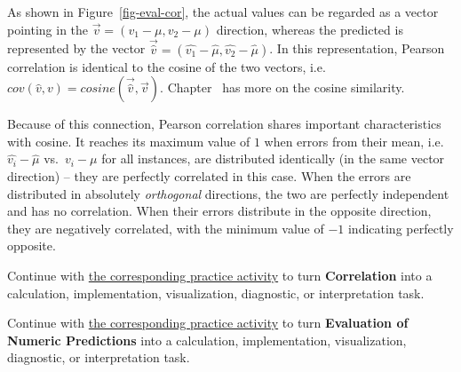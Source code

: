 \documentclass[
  letterpaper,
]{scrbook}
\begin{document}
As shown in Figure~\ref{fig-eval-cor}, the actual values can be regarded
as a vector pointing in the \(\vec{v} = (v_1-\mu, v_2-\mu)\) direction,
whereas the predicted is represented by the vector
\(\vec{\hat{v}}=(\hat{v_1}-\hat{\mu}, \hat{v_2}-\hat{\mu})\). In this
representation, Pearson correlation is identical to the cosine of the
two vectors, i.e.~\(cov(\hat{v}, v) = cosine(\vec{\hat{v}},\vec{v})\).
Chapter~ has more on the cosine similarity.

Because of this connection, Pearson correlation shares important
characteristics with cosine. It reaches its maximum value of \(1\) when
errors from their mean, i.e.~\(\hat{v_i} - \hat{\mu}\) vs.~\(v_i - \mu\)
for all instances, are distributed identically (in the same vector
direction) -- they are perfectly correlated in this case. When the
errors are distributed in absolutely \emph{orthogonal} directions, the
two are perfectly independent and has no correlation. When their errors
distribute in the opposite direction, they are negatively correlated,
with the minimum value of \(-1\) indicating perfectly opposite.

\begin{tcolorbox}[enhanced jigsaw, arc=.35mm, bottomrule=.15mm, bottomtitle=1mm, breakable, colback=white, colbacktitle=quarto-callout-tip-color!10!white, colframe=quarto-callout-tip-color-frame, coltitle=black, left=2mm, leftrule=.75mm, opacityback=0, opacitybacktitle=0.6, rightrule=.15mm, title=\textcolor{quarto-callout-tip-color}{\faLightbulb}\hspace{0.5em}{Put it into practice}, titlerule=0mm, toprule=.15mm, toptitle=1mm]

Continue with \hyperref[sec-pr-14-correlation]{the corresponding
practice activity} to turn \textbf{Correlation} into a calculation,
implementation, visualization, diagnostic, or interpretation task.

\end{tcolorbox}

\begin{tcolorbox}[enhanced jigsaw, arc=.35mm, bottomrule=.15mm, bottomtitle=1mm, breakable, colback=white, colbacktitle=quarto-callout-tip-color!10!white, colframe=quarto-callout-tip-color-frame, coltitle=black, left=2mm, leftrule=.75mm, opacityback=0, opacitybacktitle=0.6, rightrule=.15mm, title=\textcolor{quarto-callout-tip-color}{\faLightbulb}\hspace{0.5em}{Put it into practice}, titlerule=0mm, toprule=.15mm, toptitle=1mm]

Continue with \hyperref[sec-pr-14-evaluation-of-numeric-predictions]{the
corresponding practice activity} to turn \textbf{Evaluation of Numeric
Predictions} into a calculation, implementation, visualization,
diagnostic, or interpretation task.

\end{tcolorbox}
\end{document}
